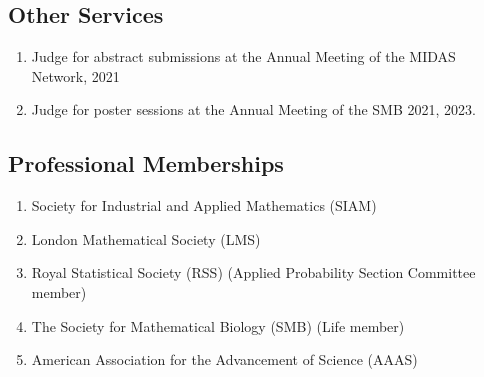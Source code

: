 \documentclass[11pt,a4paper,sans]{moderncv}        %
\begin{document}
\subsection{Other Services}
\begin{enumerate}
	\item Judge for abstract submissions at the Annual Meeting of the MIDAS Network, 2021
	\item Judge for poster sessions at the Annual Meeting of the SMB 2021, 2023. 
\end{enumerate}

\subsection{Professional Memberships}
\begin{enumerate}
	\item {Society for Industrial and Applied Mathematics (SIAM)}
	\item London Mathematical Society (LMS)
	\item Royal Statistical Society (RSS) (Applied Probability Section Committee member)
	\item {The Society for Mathematical Biology (SMB)} (Life member)
	\item {American Association for the Advancement of Science (AAAS)}
\end{enumerate}





\end{document}
